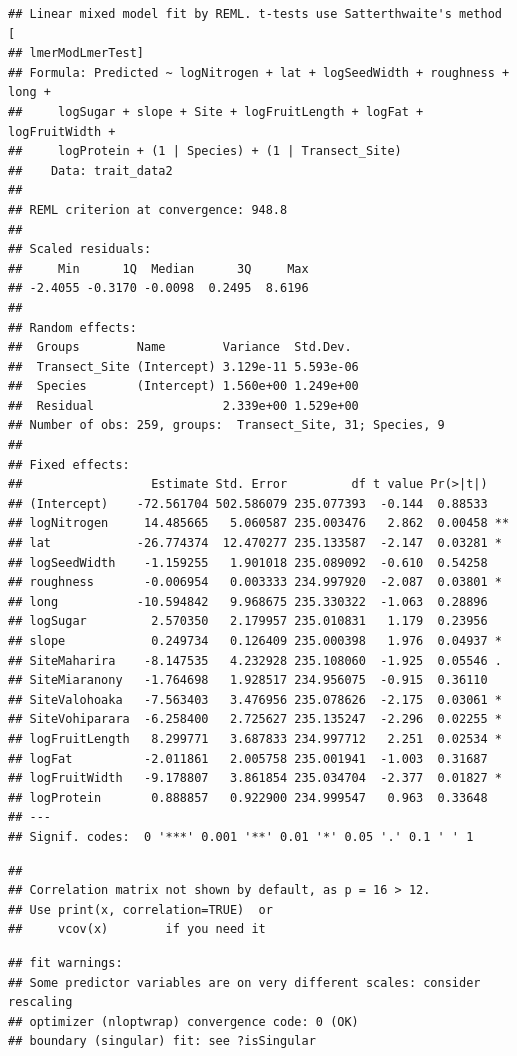 \documentclass[
  12pt,
]{article}
\begin{document}
\begin{verbatim}
## Linear mixed model fit by REML. t-tests use Satterthwaite's method [
## lmerModLmerTest]
## Formula: Predicted ~ logNitrogen + lat + logSeedWidth + roughness + long +  
##     logSugar + slope + Site + logFruitLength + logFat + logFruitWidth +  
##     logProtein + (1 | Species) + (1 | Transect_Site)
##    Data: trait_data2
## 
## REML criterion at convergence: 948.8
## 
## Scaled residuals: 
##     Min      1Q  Median      3Q     Max 
## -2.4055 -0.3170 -0.0098  0.2495  8.6196 
## 
## Random effects:
##  Groups        Name        Variance  Std.Dev. 
##  Transect_Site (Intercept) 3.129e-11 5.593e-06
##  Species       (Intercept) 1.560e+00 1.249e+00
##  Residual                  2.339e+00 1.529e+00
## Number of obs: 259, groups:  Transect_Site, 31; Species, 9
## 
## Fixed effects:
##                  Estimate Std. Error         df t value Pr(>|t|)   
## (Intercept)    -72.561704 502.586079 235.077393  -0.144  0.88533   
## logNitrogen     14.485665   5.060587 235.003476   2.862  0.00458 **
## lat            -26.774374  12.470277 235.133587  -2.147  0.03281 * 
## logSeedWidth    -1.159255   1.901018 235.089092  -0.610  0.54258   
## roughness       -0.006954   0.003333 234.997920  -2.087  0.03801 * 
## long           -10.594842   9.968675 235.330322  -1.063  0.28896   
## logSugar         2.570350   2.179957 235.010831   1.179  0.23956   
## slope            0.249734   0.126409 235.000398   1.976  0.04937 * 
## SiteMaharira    -8.147535   4.232928 235.108060  -1.925  0.05546 . 
## SiteMiaranony   -1.764698   1.928517 234.956075  -0.915  0.36110   
## SiteValohoaka   -7.563403   3.476956 235.078626  -2.175  0.03061 * 
## SiteVohiparara  -6.258400   2.725627 235.135247  -2.296  0.02255 * 
## logFruitLength   8.299771   3.687833 234.997712   2.251  0.02534 * 
## logFat          -2.011861   2.005758 235.001941  -1.003  0.31687   
## logFruitWidth   -9.178807   3.861854 235.034704  -2.377  0.01827 * 
## logProtein       0.888857   0.922900 234.999547   0.963  0.33648   
## ---
## Signif. codes:  0 '***' 0.001 '**' 0.01 '*' 0.05 '.' 0.1 ' ' 1
\end{verbatim}

\begin{verbatim}
## 
## Correlation matrix not shown by default, as p = 16 > 12.
## Use print(x, correlation=TRUE)  or
##     vcov(x)        if you need it
\end{verbatim}

\begin{verbatim}
## fit warnings:
## Some predictor variables are on very different scales: consider rescaling
## optimizer (nloptwrap) convergence code: 0 (OK)
## boundary (singular) fit: see ?isSingular
\end{verbatim}
\end{document}
